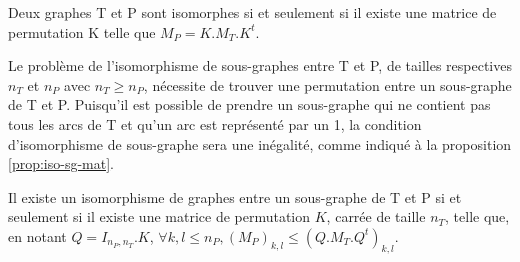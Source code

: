 \begin{prop}
 Deux graphes T et P sont isomorphes si et seulement si il existe une matrice de permutation K telle que $M_P = K.M_T.K^t$.
 \label{prop:iso-mat}
\end{prop}

Le problème de l'isomorphisme de sous-graphes entre T et P, de tailles respectives $n_T$ et $n_P$ avec $n_T\geq n_P$, nécessite de trouver une permutation entre un sous-graphe de T et P.
Puisqu'il est possible de prendre un sous-graphe qui ne contient pas tous les arcs de T et qu'un arc est représenté par un 1, la condition d'isomorphisme de sous-graphe sera une inégalité, comme indiqué à la proposition \ref{prop:iso-sg-mat}.

\begin{prop}
Il existe un isomorphisme de graphes entre un sous-graphe de T et P si et seulement si il existe une matrice de permutation $K$, carrée de taille $n_T$, telle que, en notant $Q=I_{n_P, n_T}.K$, $\forall k,l\leq n_P, (M_P)_{k,l}\leq (Q.M_T.Q^t)_{k,l}$.
\label{prop:iso-sg-mat}
\end{prop}


